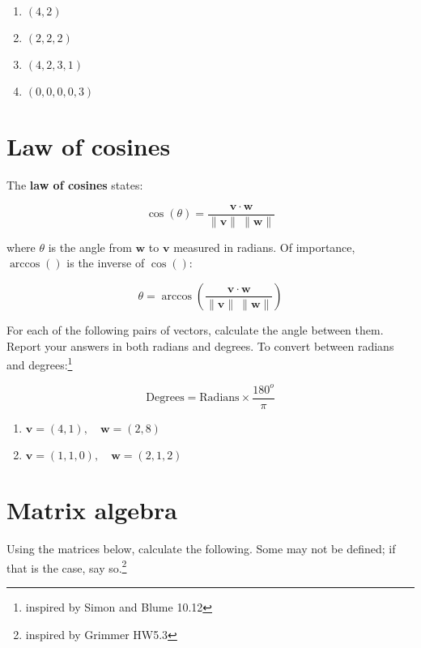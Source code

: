 \documentclass[
]{article}
\begin{document}
\begin{enumerate}
\def\labelenumi{\alph{enumi}.}
\item
  \((4, 2)\)
\item
  \((2,2,2)\)
\item
  \((4, 2, 3, 1)\)
\item
  \((0, 0, 0, 0, 3)\)
\end{enumerate}

\section{Law of cosines}\label{law-of-cosines}

The \textbf{law of cosines} states:

\[\cos(\theta) = \frac{\mathbf{v} \cdot \mathbf{w}}{\|\mathbf{v}\| \: \|\mathbf{w}\|}\]

where \(\theta\) is the angle from \(\mathbf{w}\) to \(\mathbf{v}\)
measured in radians. Of importance, \(\arccos()\) is the inverse of
\(\cos()\):

\[\theta = \arccos \left( \frac{\mathbf{v} \cdot \mathbf{w}}{\|\mathbf{v}\| \: \|\mathbf{w}\|} \right)\]

For each of the following pairs of vectors, calculate the angle between
them. Report your answers in both radians and degrees. To convert
between radians and degrees:\footnote{inspired by Simon and Blume 10.12}

\[\text{Degrees} = \text{Radians} \times \dfrac{180^{o}}{\pi}\]

\begin{enumerate}
\def\labelenumi{\alph{enumi}.}
\item
  \(\mathbf{v} = (4, 1), \quad \mathbf{w} = (2, 8)\)
\item
  \(\mathbf{v} = (1, 1, 0), \quad \mathbf{w} = (2,1, 2)\)
\end{enumerate}

\section{Matrix algebra}\label{matrix-algebra}

Using the matrices below, calculate the following. Some may not be
defined; if that is the case, say so.\footnote{inspired by Grimmer HW5.3}
\end{document}
